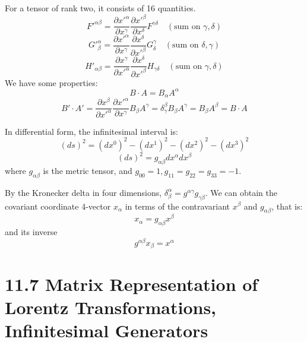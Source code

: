 \documentclass{article}
\begin{document}
	For a tensor of rank two, it consists of 16 quantities.
	$$ F'^{\alpha\beta} = \frac{\partial x'^\alpha}{\partial x^\gamma} \frac{\partial x'^\beta}{\partial x^\delta} F^{\gamma\delta} \quad (\text{sum on } \gamma, \delta) $$
	$$ G'^{\alpha}_{\beta} = \frac{\partial x'^\alpha}{\partial x^\gamma} \frac{\partial x^\delta}{\partial x'^\beta} G^{\gamma}_{\delta} \quad (\text{sum on } \delta, \gamma) $$
	$$ H'_{\alpha\beta} = \frac{\partial x^\gamma}{\partial x'^\alpha} \frac{\partial x^\delta}{\partial x'^\beta} H_{\gamma\delta} \quad (\text{sum on } \gamma, \delta) $$
	We have some properties:
	$$ B \cdot A = B_\alpha A^\alpha $$
	$$ B' \cdot A' = \frac{\partial x^\beta}{\partial x'^\alpha} \frac{\partial x'^\alpha}{\partial x^\gamma} B_\beta A^\gamma = \delta^\beta_\gamma B_\beta A^\gamma = B_\beta A^\beta = B \cdot A $$
	
	In differential form, the infinitesimal interval is:
	$$ (ds)^2 = (dx^0)^2 - (dx^1)^2 - (dx^2)^2 - (dx^3)^2 $$
	$$ (ds)^2 = g_{\alpha\beta} dx^\alpha dx^\beta $$
	where $g_{\alpha\beta}$ is the metric tensor, and $g_{00}=1, g_{11}=g_{22}=g_{33}=-1$.
	
	By the Kronecker delta in four dimensions, $\delta^\alpha_\beta = g^{\alpha\gamma} g_{\gamma\beta}$.
	We can obtain the covariant coordinate 4-vector $x_\alpha$ in terms of the contravariant $x^\beta$ and $g_{\alpha\beta}$, that is:
	$$ x_\alpha = g_{\alpha\beta} x^\beta $$
	and its inverse
	$$ g^{\alpha\beta} x_\beta = x^\alpha $$
	\section*{11.7 Matrix Representation of Lorentz Transformations, Infinitesimal Generators}
	
\end{document}
